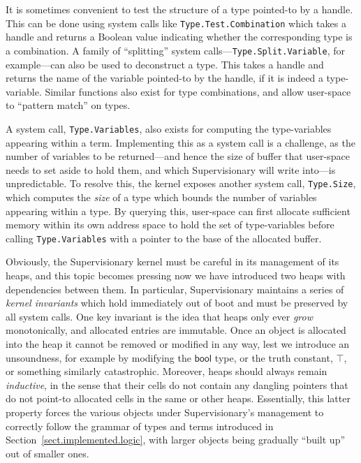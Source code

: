 \documentclass[a4paper, UKenglish, cleveref, autoref, thm-restate, colorlinks]{lipics-v2021}
\begin{document}
It is sometimes convenient to test the structure of a type pointed-to by a handle.
This can be done using system calls like \texttt{Type.Test.Combination} which takes a handle and returns a Boolean value indicating whether the corresponding type is a combination.
A family of ``splitting'' system calls---\texttt{Type.Split.Variable}, for example---can also be used to deconstruct a type.
This takes a handle and returns the name of the variable pointed-to by the handle, if it is indeed a type-variable.
Similar functions also exist for type combinations, and allow user-space to ``pattern match'' on types.

A system call, \texttt{Type.Variables}, also exists for computing the type-variables appearing within a term.
Implementing this as a system call is a challenge, as the number of variables to be returned---and hence the size of buffer that user-space needs to set aside to hold them, and which Supervisionary will write into---is unpredictable.
To resolve this, the kernel exposes another system call, \texttt{Type.Size}, which computes the \emph{size} of a type which bounds the number of variables appearing within a type.
By querying this, user-space can first allocate sufficient memory within its own address space to hold the set of type-variables before calling \texttt{Type.Variables} with a pointer to the base of the allocated buffer.

Obviously, the Supervisionary kernel must be careful in its management of its heaps, and this topic becomes pressing now we have introduced two heaps with dependencies between them.
In particular, Supervisionary maintains a series of \emph{kernel invariants} which hold immediately out of boot and must be preserved by all system calls.
One key invariant is the idea that heaps only ever \emph{grow} monotonically, and allocated entries are immutable.
Once an object is allocated into the heap it cannot be removed or modified in any way, lest we introduce an unsoundness, for example by modifying the $\mathsf{bool}$ type, or the truth constant, $\top$, or something similarly catastrophic.
Moreover, heaps should always remain \emph{inductive}, in the sense that their cells do not contain any dangling pointers that do not point-to allocated cells in the same or other heaps.
Essentially, this latter property forces the various objects under Supervisionary's management to correctly follow the grammar of types and terms introduced in Section~\ref{sect.implemented.logic}, with larger objects being gradually ``built up'' out of smaller ones.
\end{document}
